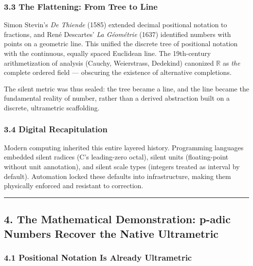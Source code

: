 \documentclass[
]{article}
\begin{document}
\subsubsection{3.3 The Flattening: From Tree to
Line}\label{the-flattening-from-tree-to-line}

Simon Stevin's \emph{De Thiende} (1585) extended decimal positional
notation to fractions, and René Descartes' \emph{La Géométrie} (1637)
identified numbers with points on a geometric line. This unified the
discrete tree of positional notation with the continuous, equally spaced
Euclidean line. The 19th-century arithmetization of analysis (Cauchy,
Weierstrass, Dedekind) canonized \(\mathbb{R}\) as \emph{the} complete
ordered field --- obscuring the existence of alternative completions.

The silent metric was thus sealed: the tree became a line, and the line
became the fundamental reality of number, rather than a derived
abstraction built on a discrete, ultrametric scaffolding.

\subsubsection{3.4 Digital Recapitulation}\label{digital-recapitulation}

Modern computing inherited this entire layered history. Programming
languages embedded silent radices (C's leading-zero octal), silent units
(floating-point without unit annotation), and silent scale types
(integers treated as interval by default). Automation locked these
defaults into infrastructure, making them physically enforced and
resistant to correction.

\begin{center}\rule{0.5\linewidth}{0.5pt}\end{center}

\subsection{4. The Mathematical Demonstration: p-adic Numbers Recover
the Native
Ultrametric}\label{the-mathematical-demonstration-p-adic-numbers-recover-the-native-ultrametric}

\subsubsection{4.1 Positional Notation Is Already
Ultrametric}\label{positional-notation-is-already-ultrametric}
\end{document}
